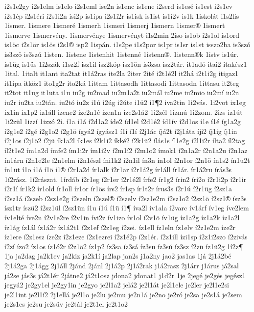 {i2s1e2gy
i2s1elm
is1elo
i2s1eml
ise2n
is1enc
is1ene
i2serd
is1esé
is1est
i2s1ev
i2s1ép
i2s1éri
i2s1i2n
isi2p
is1ipa
i2s1i2r
is1isk
is1ist
is1í2v
is1k
1iskolát
i1s2lis
1ismer.
1ismere
1ismeré
1ismerh
1ismeri
1ismerj
1ismern
1ismer®
1ismert
1ismerve
1ismervény.
1ismervénye
1ismervényt
i1s2min
2iso
is1ob
i2s1ol
is1ord
is1öc
i2s1ör
is1ös
i2s1®
isp2
1ispán.
i1s2pe
i1s2por
is1pr
is1sr
is1st
isszo2ba
is3szó
is3szö
is3szú
1isten.
1istene
1istenhit
1istenné
1istenn®.
1istenn®k
1istv
is1úr.
is1üg
is1üs
1i2szák
i1sz2f
isz1il
isz2kóp
isz1ön
is3zsa
isz2tár.
it1adó
itai2
itakész1
1ital.
1italt
it1ant
ita2tat
it1á2ras
ite2la
2iter
2ité
i2t1é2l
it2há
i2t1i2g
itigaz1
it1ipa
itköz1
ito1g2r
ito2ká
1ittam
1ittasodh
1ittasodi
1ittasodn
1ittasu
it2teg
it2tot
it1ug
it1uta
i1u
iu2g
iu2mad
iu2m1a2t
iu2mál
iu2me
iu2mio
iu2mí
iu2n
iu2r
iu2ta
iu2tán.
iu2tó
iu2z
i1ú
i2úg
i2úte
i1ü2
i1¶2
iva2tin
1i2vás.
1i2vot
ix1eg
ix1in
ix1p2
iz1áll
izene2
ize2n1é
izen1n
ize2s1á2
1i2zél
1izmú
1i2zom.
2izs
iz1út
1i2zül
1izzí
1izzó
2í.
í1a
í1á
í2d1a2
íde2
íd1el
í2d1é2
íd1ív
í2d1os
í1e
í1é
íg1a2g
í2g1e2
í2gé
í2g1o2
í2g1ö
ígyá2
ígyász1
í1i
í1í
í2j1ác
íjá2t
í2j1áta
íji2
íj1ig
íj1in
í2j1os
í2j1ö2
í2jü
ík1a2l
ík1es
í2k1i2
íkké2
í2k1ü2
ílás1s
íl1e2g
í2l1i2r
ílta2
íl2tag
íl2t1e2
ím1a2d
ímfe2
ím1i2r
ím1i2v
í2m1í2
í2m1o2
ímok1
í2n1a2r
í2n1a2u
í2n1az
ín1árn
í2n1e2le
í2n1elm
í2n1észl
íni1k2
í2n1il
ín3n
ín1ol
í2n1or
í2n1ö
ín1s2
ín1u2t
ín1üt
í1o
í1ó
í1ö
í1®
í2r1a2d
ír1alk
í2r1ar
í2r1á2g
ír1áll
ír1ár.
ír1á2ru
írás3s
1í2rász.
1í2rászat.
1írdáb
í2r1eg
í2r1er
í2r1é2l
írfe2
ír1g2
írin2
íri2o
í2r1i2p
í2r1ir
í2r1í
ír1k2
ír1old
ír1oll
ír1or
ír1ös
írs2
ír1sp
ír1t2r
írus3s
í2r1ú
í2r1üg
í2sz1a
í2sz1á
í2szeb
í2sz1e2g
í2szeln
í2szel®
í2szelv
í2sz1e2m
í2sz1o2
í2sz1ö
í2sz1®
ísz3s
ísz1tr
íszü2
í2sz1ül
í2sz1ün
í1u
í1ú
í1ü
í1¶
íva2l
ív1ala
í2varc
ív1árf
ív1eg
íve2lem
ív1elté
íve2n
í2v1e2re
í2v1in
ívi2z
ív1izo
ív1ol
í2v1ö
ív1üg
íz1a2g
íz1a2k
íz1a2l
íz1ág
íz1ál
íz1á2r
íz1á2t1
í2z1ef
í2z1eg
í2zei.
íz1ell
íz1eln
íz1elv
í2z1e2m
íze2r
íz1ere
í2z1esz
íze2z
í2z1eze
í2z1ezrei
í2z1é2p
í2z1ér.
í2z1ill
ízi1sp
í2z1i2szo
í2zivás
í2zí
ízo2
íz1os
íz1ó2r
í2z1ö2
íz1p2
íz3sa
íz3sá
íz3su
íz3sú
íz3sz
í2zü
íz1ü2g
1í2z¶
1ja
ja2dag
ja2k1ev
ja2kiz
ja2k1í
ja2lap
jan2s
j1a2ny
jao2
jas1as
1já
2j1á2bé
2j1á2ga
2j1ágg
2j1áll
2jánd
2jánl
2j1á2p
2j1á2rak
j1á2rasz
2j1árr
j1árus
já2sal
já2se
jás3s
já2t1ér
2játne2
já2t1osz
jdona2
jdonat1
j1d2r
1je
2jegé
je2gés
jegész1
jegyá2
je2gy1el
je2gy1in
je2gyo
je2l1a2
jelá2
je2l1át
je2l1ele
je2ler
je2l1e2si
je2l1int
je2l1í2
2j1ellá
je2l1o
je2lu
je2mu
je2n1á
je2no
je2ró
je2sa
je2s1á
je2sem
je2s1es
je2su
je2süv
je2tál
je2t1el
je2t1o2
}
